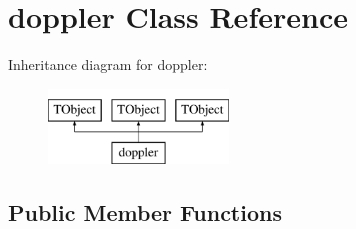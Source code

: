 \hypertarget{classdoppler}{}\section{doppler Class Reference}
\label{classdoppler}
Inheritance diagram for doppler\+:\begin{figure}[H]
\begin{center}
\leavevmode
\includegraphics[height=2.000000cm]{classdoppler}
\end{center}
\end{figure}
\subsection*{Public Member Functions}
